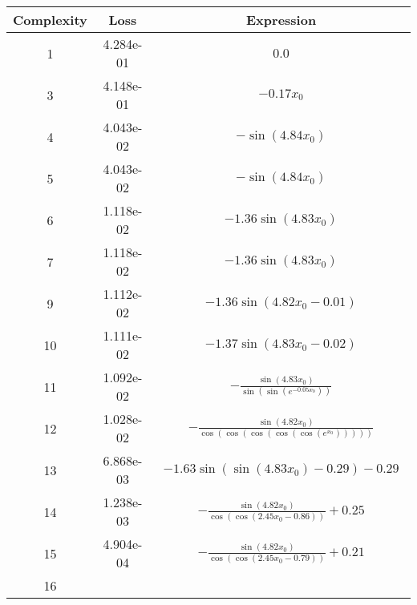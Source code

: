 \begin{center}
        \begin{tabular}{|c|c|c|}
        \hline
        Complexity & Loss & Expression \\
        \hline
        1 & 4.284e-01 & $\begin{aligned}0.0\end{aligned}$\\ \hline3 & 4.148e-01 & $\begin{aligned}- 0.17 x_{0}\end{aligned}$\\ \hline4 & 4.043e-02 & $\begin{aligned}- \sin{\left(4.84 x_{0} \right)}\end{aligned}$\\ \hline5 & 4.043e-02 & $\begin{aligned}- \sin{\left(4.84 x_{0} \right)}\end{aligned}$\\ \hline6 & 1.118e-02 & $\begin{aligned}- 1.36 \sin{\left(4.83 x_{0} \right)}\end{aligned}$\\ \hline7 & 1.118e-02 & $\begin{aligned}- 1.36 \sin{\left(4.83 x_{0} \right)}\end{aligned}$\\ \hline9 & 1.112e-02 & $\begin{aligned}- 1.36 \sin{\left(4.82 x_{0} - 0.01 \right)}\end{aligned}$\\ \hline10 & 1.111e-02 & $\begin{aligned}- 1.37 \sin{\left(4.83 x_{0} - 0.02 \right)}\end{aligned}$\\ \hline11 & 1.092e-02 & $\begin{aligned}- \frac{\sin{\left(4.83 x_{0} \right)}}{\sin{\left(\sin{\left(e^{- 0.05 x_{0}} \right)} \right)}}\end{aligned}$\\ \hline12 & 1.028e-02 & $\begin{aligned}- \frac{\sin{\left(4.82 x_{0} \right)}}{\cos{\left(\cos{\left(\cos{\left(\cos{\left(\cos{\left(e^{x_{0}} \right)} \right)} \right)} \right)} \right)}}\end{aligned}$\\ \hline13 & 6.868e-03 & $\begin{aligned}- 1.63 \sin{\left(\sin{\left(4.83 x_{0} \right)} - 0.29 \right)} - 0.29\end{aligned}$\\ \hline14 & 1.238e-03 & $\begin{aligned}- \frac{\sin{\left(4.82 x_{0} \right)}}{\cos{\left(\cos{\left(2.45 x_{0} - 0.86 \right)} \right)}} + 0.25\end{aligned}$\\ \hline15 & 4.904e-04 & $\begin{aligned}- \frac{\sin{\left(4.82 x_{0} \right)}}{\cos{\left(\cos{\left(2.45 x_{0} - 0.79 \right)} \right)}} + 0.21\end{aligned}$\\ \hline16 
\end{tabular}
\end{center}
